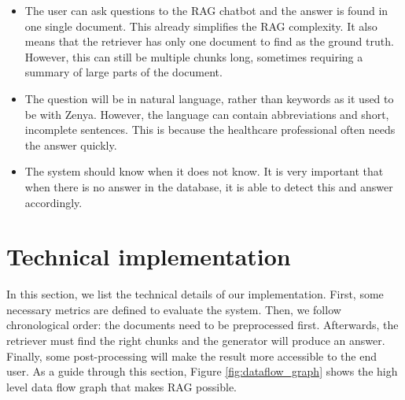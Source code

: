 \begin{itemize}
    \item The user can ask questions to the RAG chatbot and the answer is found in one single document. This already simplifies the RAG complexity. It also means that the retriever has only one document to find as the ground truth. However, this can still be multiple chunks long, sometimes requiring a summary of large parts of the document.
    \item The question will be in natural language, rather than keywords as it used to be with Zenya. However, the language can contain abbreviations and short, incomplete sentences. This is because the healthcare professional often needs the answer quickly.
    \item The system should know when it does not know. It is very important that when there is no answer in the database, it is able to detect this and answer accordingly.
\end{itemize}


\section{Technical implementation}
In this section, we list the technical details of our implementation. First, some necessary metrics are defined to evaluate the system. Then, we follow chronological order: the documents need to be preprocessed first. Afterwards, the retriever must find the right chunks and the generator will produce an answer. Finally, some post-processing will make the result more accessible to the end user. As a guide through this section, Figure \ref{fig:dataflow_graph} shows the high level data flow graph that makes RAG possible.

